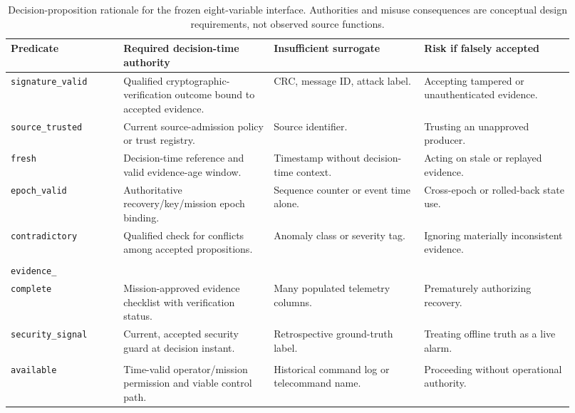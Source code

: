 \documentclass[preprint,12pt]{elsarticle}
\begin{document}
\begin{table}[H]
\centering
\scriptsize
\caption{Decision-proposition rationale for the frozen eight-variable interface. Authorities and misuse consequences are conceptual design requirements, not observed source functions.}
\label{tab:predicatecontract}
\setlength{\tabcolsep}{2pt}
\begin{tabular}{>{\raggedright\arraybackslash}p{0.185\linewidth}>{\raggedright\arraybackslash}p{0.245\linewidth}>{\raggedright\arraybackslash}p{0.245\linewidth}>{\raggedright\arraybackslash}p{0.245\linewidth}}
\toprule
Predicate & Required decision-time authority & Insufficient surrogate & Risk if falsely accepted \\
\midrule
\texttt{signature\_valid} & Qualified cryptographic-verification outcome bound to accepted evidence. & CRC, message ID, attack label. & Accepting tampered or unauthenticated evidence. \\
\texttt{source\_trusted} & Current source-admission policy or trust registry. & Source identifier. & Trusting an unapproved producer. \\
\texttt{fresh} & Decision-time reference and valid evidence-age window. & Timestamp without decision-time context. & Acting on stale or replayed evidence. \\
\texttt{epoch\_valid} & Authoritative recovery/key/mission epoch binding. & Sequence counter or event time alone. & Cross-epoch or rolled-back state use. \\
\texttt{contradictory} & Qualified check for conflicts among accepted propositions. & Anomaly class or severity tag. & Ignoring materially inconsistent evidence. \\
\shortstack[l]{\texttt{minimum\_}\\\texttt{evidence\_}\\\texttt{complete}} & Mission-approved evidence checklist with verification status. & Many populated telemetry columns. & Prematurely authorizing recovery. \\
\texttt{security\_signal} & Current, accepted security guard at decision instant. & Retrospective ground-truth label. & Treating offline truth as a live alarm. \\
\shortstack[l]{\texttt{authorization\_}\\\texttt{available}} & Time-valid operator/mission permission and viable control path. & Historical command log or telecommand name. & Proceeding without operational authority. \\
\bottomrule
\end{tabular}
\end{table}
\end{document}
